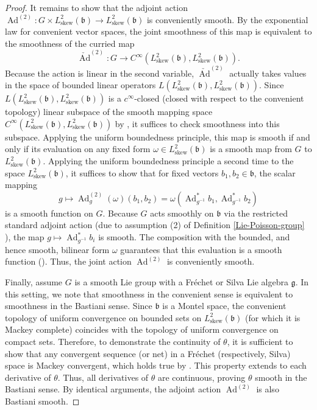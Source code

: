\documentclass[11pt,reqno]{amsart}
\theoremstyle{definition}
\numberwithin{equation}{section}
\begin{document}
\begin{proof}
It remains to show that the adjoint action $\operatorname{Ad}^{(2)}: G \times L^2_{\text{skew}}(\mathfrak{b}) \rightarrow L^2_{\text{skew}}(\mathfrak{b})$ is conveniently smooth. By the exponential law for convenient vector spaces, the joint smoothness of this map is equivalent to the smoothness of the curried map
\[ 
\check{\operatorname{Ad}}^{(2)}: G \rightarrow C^{\infty}\left(L^2_{\text{skew}}(\mathfrak{b}), L^2_{\text{skew}}(\mathfrak{b})\right). 
\]
Because the action is linear in the second variable, $\check{\operatorname{Ad}}^{(2)}$ actually takes values in the space of bounded linear operators $L\left(L^2_{\text{skew}}(\mathfrak{b}), L^2_{\text{skew}}(\mathfrak{b})\right)$. Since $L\left(L^2_{\text{skew}}(\mathfrak{b}), L^2_{\text{skew}}(\mathfrak{b})\right)$ is a $c^\infty$-closed (closed with respect to the convenient topology) linear subspace of the smooth mapping space $C^{\infty}\left(L^2_{\text{skew}}(\mathfrak{b}), L^2_{\text{skew}}(\mathfrak{b})\right)$ by \cite[Proposition 5.6]{20}, it suffices to check smoothness into this subspace. Applying the uniform boundedness principle, this map is smooth if and only if its evaluation on any fixed form $\omega \in L^2_{\text{skew}}(\mathfrak{b})$ is a smooth map from $G$ to $L^2_{\text{skew}}(\mathfrak{b})$. Applying the uniform boundedness principle a second time to the space $L^2_{\text{skew}}(\mathfrak{b})$, it suffices to show that for fixed vectors $b_1, b_2 \in \mathfrak{b}$, the scalar mapping
\[ 
g \mapsto \operatorname{Ad}^{(2)}_g(\omega)(b_1, b_2) = \omega(\operatorname{Ad}_{g^{-1}}^*b_1, \operatorname{Ad}_{g^{-1}}^*b_2) 
\]
is a smooth function on $G$. Because $G$ acts smoothly on $\mathfrak{b}$ via the restricted standard adjoint action (due to assumption (2) of Definition \ref{Lie-Poisson-group} ), the map $g \mapsto \operatorname{Ad}_{g^{-1}}^*b_i$ is smooth. The composition with the bounded, and hence smooth, bilinear form $\omega$ guarantees that this evaluation is a smooth function (\cite[Corollary 3.13]{20}). Thus, the joint action $\operatorname{Ad}^{(2)}$ is conveniently smooth.

Finally, assume $G$ is a smooth Lie group with a Fréchet or Silva Lie algebra $\mathfrak{g}$. In this setting, we note that smoothness in the convenient sense is equivalent to smoothness in the Bastiani sense. Since $\mathfrak{b}$ is a Montel space, the convenient topology of uniform convergence on bounded sets on $L^2_{\text{skew}}(\mathfrak{b})$ (for which it is Mackey complete) coincides with the topology of uniform convergence on compact sets. Therefore, to demonstrate the continuity of $\theta$, it is sufficient to show that any convergent sequence (or net) in a Fréchet (respectively, Silva) space is Mackey convergent, which holds true by \cite[4.11]{20}. This property extends to each derivative of $\theta$. Thus, all derivatives of $\theta$ are continuous, proving $\theta$ smooth in the Bastiani sense. By identical arguments, the adjoint action $\operatorname{Ad}^{(2)}$ is also Bastiani smooth.
\end{proof}
\end{document}
